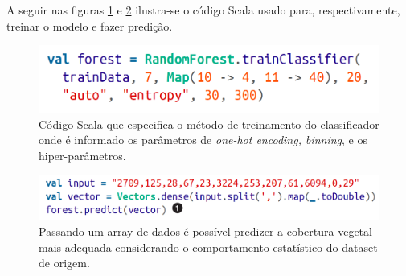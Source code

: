 \documentclass[12pt]{article}
\begin{document}
A seguir nas figuras \ref{fig:scala-code} e \ref{fig:predict-scala-code} ilustra-se o código Scala usado para, respectivamente, treinar o modelo e fazer predição.


\begin{figure}[!ht]
	\centering
	\begin{minipage}[t]{0.55\textwidth}
        \includegraphics[width=\textwidth]{img/randomForest-Scala-code.png}
        \centering
	\end{minipage}
	\caption
	{
	   Código Scala que especifica o método de treinamento do classificador onde é informado os parâmetros de \emph{one-hot encoding, binning}, e os hiper-parâmetros.
	}
	\label{fig:scala-code}
\end{figure}


\begin{figure}[!ht]
	\centering
	\begin{minipage}[t]{0.55\textwidth}
        \includegraphics[width=\textwidth]{img/randomForest-predict-Scala-code.png}
        \centering
	\end{minipage}
	\caption
	{
	   Passando um array de dados é possível predizer a cobertura vegetal mais adequada considerando o comportamento estatístico do dataset de origem.
	}
	\label{fig:predict-scala-code}
\end{figure}

% 
% 
% 
% 
\end{document}
